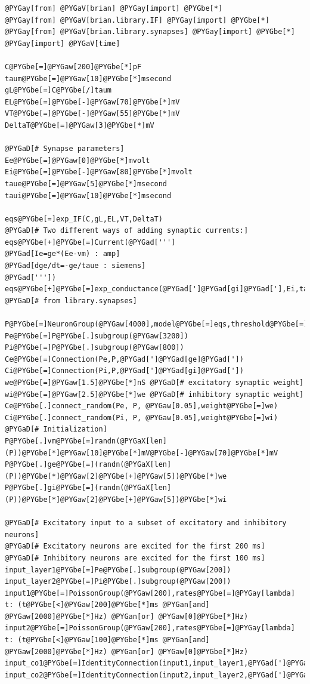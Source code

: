 \documentclass[letterpaper,10pt]{manual}
\begin{document}
\begin{Verbatim}[commandchars=@\[\]]
@PYGay[from] @PYGaV[brian] @PYGay[import] @PYGbe[*]
@PYGay[from] @PYGaV[brian.library.IF] @PYGay[import] @PYGbe[*]
@PYGay[from] @PYGaV[brian.library.synapses] @PYGay[import] @PYGbe[*]
@PYGay[import] @PYGaV[time]

C@PYGbe[=]@PYGaw[200]@PYGbe[*]pF
taum@PYGbe[=]@PYGaw[10]@PYGbe[*]msecond
gL@PYGbe[=]C@PYGbe[/]taum
EL@PYGbe[=]@PYGbe[-]@PYGaw[70]@PYGbe[*]mV
VT@PYGbe[=]@PYGbe[-]@PYGaw[55]@PYGbe[*]mV
DeltaT@PYGbe[=]@PYGaw[3]@PYGbe[*]mV

@PYGaD[# Synapse parameters]
Ee@PYGbe[=]@PYGaw[0]@PYGbe[*]mvolt
Ei@PYGbe[=]@PYGbe[-]@PYGaw[80]@PYGbe[*]mvolt
taue@PYGbe[=]@PYGaw[5]@PYGbe[*]msecond
taui@PYGbe[=]@PYGaw[10]@PYGbe[*]msecond

eqs@PYGbe[=]exp_IF(C,gL,EL,VT,DeltaT)
@PYGaD[# Two different ways of adding synaptic currents:]
eqs@PYGbe[+]@PYGbe[=]Current(@PYGad[''']
@PYGad[Ie=ge*(Ee-vm) : amp]
@PYGad[dge/dt=-ge/taue : siemens]
@PYGad['''])
eqs@PYGbe[+]@PYGbe[=]exp_conductance(@PYGad[']@PYGad[gi]@PYGad['],Ei,taui) @PYGaD[# from library.synapses]

P@PYGbe[=]NeuronGroup(@PYGaw[4000],model@PYGbe[=]eqs,threshold@PYGbe[=]@PYGbe[-]@PYGaw[20]@PYGbe[*]mvolt,reset@PYGbe[=]EL,refractory@PYGbe[=]@PYGaw[2]@PYGbe[*]ms)
Pe@PYGbe[=]P@PYGbe[.]subgroup(@PYGaw[3200])
Pi@PYGbe[=]P@PYGbe[.]subgroup(@PYGaw[800])
Ce@PYGbe[=]Connection(Pe,P,@PYGad[']@PYGad[ge]@PYGad['])
Ci@PYGbe[=]Connection(Pi,P,@PYGad[']@PYGad[gi]@PYGad['])
we@PYGbe[=]@PYGaw[1.5]@PYGbe[*]nS @PYGaD[# excitatory synaptic weight]
wi@PYGbe[=]@PYGaw[2.5]@PYGbe[*]we @PYGaD[# inhibitory synaptic weight]
Ce@PYGbe[.]connect_random(Pe, P, @PYGaw[0.05],weight@PYGbe[=]we)
Ci@PYGbe[.]connect_random(Pi, P, @PYGaw[0.05],weight@PYGbe[=]wi)
@PYGaD[# Initialization]
P@PYGbe[.]vm@PYGbe[=]randn(@PYGaX[len](P))@PYGbe[*]@PYGaw[10]@PYGbe[*]mV@PYGbe[-]@PYGaw[70]@PYGbe[*]mV
P@PYGbe[.]ge@PYGbe[=](randn(@PYGaX[len](P))@PYGbe[*]@PYGaw[2]@PYGbe[+]@PYGaw[5])@PYGbe[*]we
P@PYGbe[.]gi@PYGbe[=](randn(@PYGaX[len](P))@PYGbe[*]@PYGaw[2]@PYGbe[+]@PYGaw[5])@PYGbe[*]wi

@PYGaD[# Excitatory input to a subset of excitatory and inhibitory neurons]
@PYGaD[# Excitatory neurons are excited for the first 200 ms]
@PYGaD[# Inhibitory neurons are excited for the first 100 ms]
input_layer1@PYGbe[=]Pe@PYGbe[.]subgroup(@PYGaw[200])
input_layer2@PYGbe[=]Pi@PYGbe[.]subgroup(@PYGaw[200])
input1@PYGbe[=]PoissonGroup(@PYGaw[200],rates@PYGbe[=]@PYGay[lambda] t: (t@PYGbe[<]@PYGaw[200]@PYGbe[*]ms @PYGan[and] @PYGaw[2000]@PYGbe[*]Hz) @PYGan[or] @PYGaw[0]@PYGbe[*]Hz)
input2@PYGbe[=]PoissonGroup(@PYGaw[200],rates@PYGbe[=]@PYGay[lambda] t: (t@PYGbe[<]@PYGaw[100]@PYGbe[*]ms @PYGan[and] @PYGaw[2000]@PYGbe[*]Hz) @PYGan[or] @PYGaw[0]@PYGbe[*]Hz)
input_co1@PYGbe[=]IdentityConnection(input1,input_layer1,@PYGad[']@PYGad[ge]@PYGad['],weight@PYGbe[=]we)
input_co2@PYGbe[=]IdentityConnection(input2,input_layer2,@PYGad[']@PYGad[ge]@PYGad['],weight@PYGbe[=]we)


\end{Verbatim}
\end{document}
